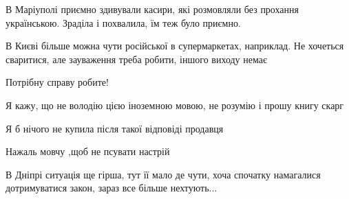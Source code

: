 \begin{itemize}
 

В Маріуполі приємно здивували касири, які розмовляли без прохання українською.
Зраділа і похвалила, їм теж було приємно.

В Києві більше можна чути російської в супермаркетах, наприклад. Не хочеться
сваритися, але зауваження треба робити, іншого виходу немає💙💛


 
Потрібну справу робите!

 
Я кажу, що не володію цією іноземною мовою, не розумію і прошу книгу скарг

 
Я б нічого не купила після такої відповіді продавця

 
Нажаль мовчу ,щоб не псувати настрій

 
В Дніпрі ситуація ще гірша, тут її мало де чути, хоча спочатку намагалися дотримуватися закон, зараз все більше нехтують...


\end{itemize}
